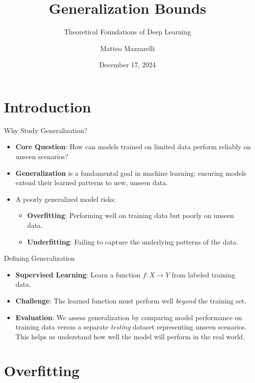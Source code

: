 \documentclass[
  ignorenonframetext,
]{beamer}
\title{Generalization Bounds}
\subtitle{Theoretical Foundations of Deep Learning}
\author{Matteo Mazzarelli}
\date{December 17, 2024}
\providecommand{\tightlist}{%
  \setlength{\itemsep}{0pt}\setlength{\parskip}{0pt}}\usepackage{longtable,booktabs,array}
\begin{document}
\frame{\titlepage}


\section{Introduction}\label{introduction}

\begin{frame}{Why Study Generalization?}
\label{why-study-generalization}
\begin{itemize}
\tightlist
\item
  \textbf{Core Question}: How can models trained on limited data perform
  reliably on unseen scenarios?
\item
  \textbf{Generalization} is a fundamental goal in machine learning:
  ensuring models extend their learned patterns to new, unseen data.
\item
  A poorly generalized model risks:

  \begin{itemize}
  \tightlist
  \item
    \textbf{Overfitting}: Performing well on training data but poorly on
    unseen data.
  \item
    \textbf{Underfitting}: Failing to capture the underlying patterns of
    the data.
  \end{itemize}
\end{itemize}
\end{frame}

\begin{frame}{Defining Generalization}
\label{defining-generalization}
\begin{itemize}
\tightlist
\item
  \textbf{Supervised Learning}: Learn a function \(f: X \to Y\) from
  labeled training data.
\item
  \textbf{Challenge}: The learned function must perform well
  \emph{beyond} the training set.
\item
  \textbf{Evaluation}: We assess generalization by comparing model
  performance on training data versus a separate \emph{testing} dataset
  representing unseen scenarios. This helps us understand how well the
  model will perform in the real world.
\end{itemize}
\end{frame}

\section{Overfitting}\label{overfitting}
\end{document}
